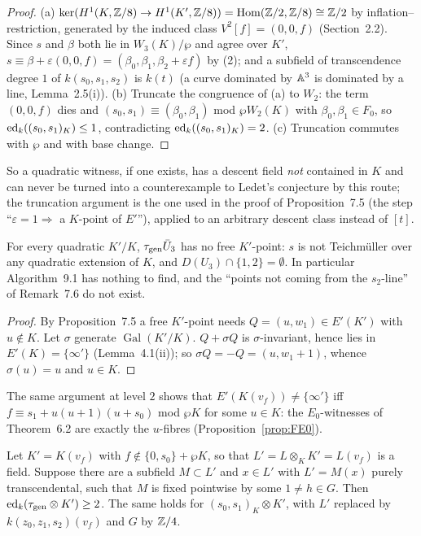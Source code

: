 \begin{proof}
(a) $\ker(H^1(K,\mathbb Z/8)\to H^1(K',\mathbb Z/8))=\operatorname{Hom}(\mathbb Z/2,\mathbb Z/8)\cong\mathbb Z/2$ by
inflation--restriction, generated by the induced class $V^2[f]=(0,0,f)$ (Section~2.2).
Since $s$ and $\beta$ both lie in $W_3(K)/\wp$ and agree over $K'$, $s\equiv\beta+
\varepsilon(0,0,f)=(\beta_0,\beta_1,\beta_2+\varepsilon f)$ by (2); and a subfield of
transcendence degree $1$ of $k(s_0,s_1,s_2)$ is $k(t)$ (a curve dominated by $\mathbb A^3$ is
dominated by a line, Lemma~2.5(i)). (b) Truncate the congruence of (a) to $W_2$: the
term $(0,0,f)$ dies and $(s_0,s_1)\equiv(\beta_0,\beta_1)$ mod $\wp W_2(K)$ with
$\beta_0,\beta_1\in F_0$, so $\operatorname{ed}_k((s_0,s_1)_K)\le1$, contradicting
$\operatorname{ed}_k((s_0,s_1)_K)=2$. (c) Truncation commutes with $\wp$ and with base change.
\end{proof}

So a quadratic witness, if one exists, has a descent field \emph{not} contained in $K$
and can never be turned into a counterexample to Ledet's conjecture by this route; the
truncation argument is the one used in the proof of Proposition~7.5 (the step
``$\varepsilon=1\Rightarrow$ a $K$-point of $E'$''), applied to an arbitrary descent
class instead of $[t]$.

\begin{corollary}\label{cor:noquad}
For every quadratic $K'/K$, $\tau_{\mathrm{gen}}\bar U_3$ has no free $K'$-point: $s$ is not
Teichm\"uller over any quadratic extension of $K$, and $D(U_3)\cap\{1,2\}=\emptyset$.
In particular Algorithm~9.1 has nothing to find, and the ``points not coming from the
$s_2$-line'' of Remark~7.6 do not exist. 
\end{corollary}

\begin{proof}
By Proposition~7.5 a free $K'$-point needs $Q=(u,w_1)\in E'(K')$ with $u\notin K$. Let
$\sigma$ generate $\operatorname{Gal}(K'/K)$. $Q+\sigma Q$ is $\sigma$-invariant, hence
lies in $E'(K)=\{\infty'\}$ (Lemma~4.1(ii)); so $\sigma Q=-Q=(u,w_1+1)$, whence
$\sigma(u)=u$ and $u\in K$.
\end{proof}

The same argument at level $2$ shows that $E'(K(v_f))\ne\{\infty'\}$ iff $f\equiv
s_1+u(u+1)(u+s_0)$ mod $\wp K$ for some $u\in K$: the $E_0$-witnesses of Theorem~6.2
are exactly the $u$-fibres (Proposition~\ref{prop:FE0}).

\begin{proposition}\label{prop:fft}
Let $K'=K(v_f)$ with $f\notin\{0,s_0\}+\wp K$, so that $L'=L\otimes_KK'=L(v_f)$ is a
field. Suppose there are a subfield $M\subset L'$ and $x\in L'$ with $L'=M(x)$ purely
transcendental, such that $M$ is fixed pointwise by some $1\ne h\in G$. Then
$\operatorname{ed}_k(\tau_{\mathrm{gen}}\otimes K')\ge2$. The same holds for $(s_0,s_1)_K\otimes K'$, with $L'$
replaced by $k(z_0,z_1,s_2)(v_f)$ and $G$ by $\mathbb Z/4$. 
\end{proposition}


